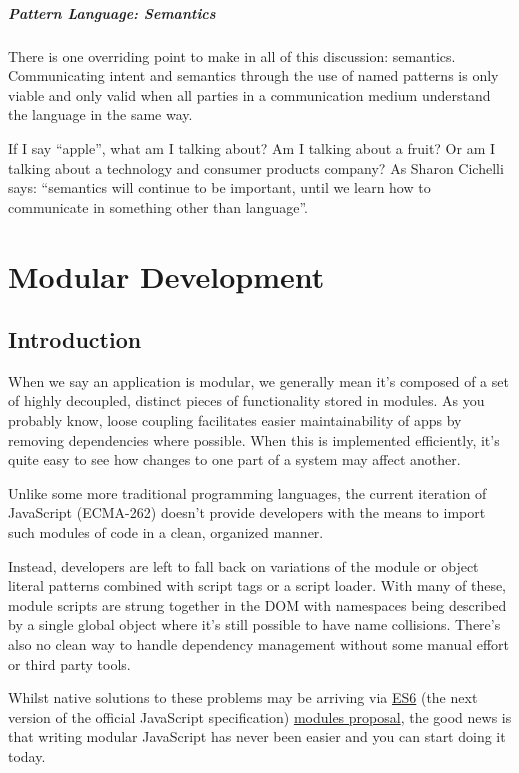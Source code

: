 \documentclass[9pt]{book}
\begin{document}
\subparagraph{Pattern Language:
Semantics}\label{pattern-language-semantics}

There is one overriding point to make in all of this discussion:
semantics. Communicating intent and semantics through the use of named
patterns is only viable and only valid when all parties in a
communication medium understand the language in the same way.

If I say ``apple'', what am I talking about? Am I talking about a fruit?
Or am I talking about a technology and consumer products company? As
Sharon Cichelli says: ``semantics will continue to be important, until
we learn how to communicate in something other than language''.

\section{Modular Development}\label{modular-development}

\subsection{Introduction}\label{introduction-1}

When we say an application is modular, we generally mean it's composed
of a set of highly decoupled, distinct pieces of functionality stored in
modules. As you probably know, loose coupling facilitates easier
maintainability of apps by removing dependencies where possible. When
this is implemented efficiently, it's quite easy to see how changes to
one part of a system may affect another.

Unlike some more traditional programming languages, the current
iteration of JavaScript (ECMA-262) doesn't provide developers with the
means to import such modules of code in a clean, organized manner.

Instead, developers are left to fall back on variations of the module or
object literal patterns combined with script tags or a script loader.
With many of these, module scripts are strung together in the DOM with
namespaces being described by a single global object where it's still
possible to have name collisions. There's also no clean way to handle
dependency management without some manual effort or third party tools.

Whilst native solutions to these problems may be arriving via
\href{http://wiki.ecmascript.org/doku.php?id=harmony:specification_drafts}{ES6}
(the next version of the official JavaScript specification)
\href{http://wiki.ecmascript.org/doku.php?id=harmony:modules}{modules
proposal}, the good news is that writing modular JavaScript has never
been easier and you can start doing it today.
\end{document}
